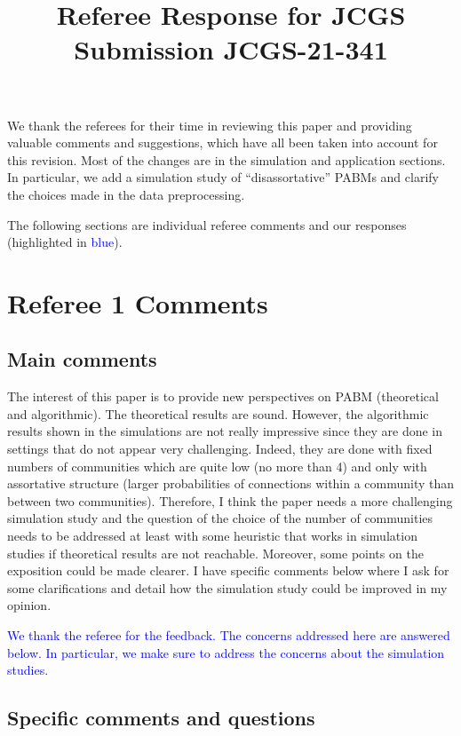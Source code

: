 \documentclass[
]{article}
\title{Referee Response for JCGS Submission JCGS-21-341}
\author{}
\date{\vspace{-2.5em}}
\begin{document}
\maketitle

We thank the referees for their time in reviewing this paper and
providing valuable comments and suggestions, which have all been taken
into account for this revision. Most of the changes are in the
simulation and application sections. In particular, we add a simulation
study of ``disassortative'' PABMs and clarify the choices made in the
data preprocessing.

The following sections are individual referee comments and our responses
(highlighted in \textcolor{blue}{blue}).

\hypertarget{referee-1-comments}{%
\section{Referee 1 Comments}\label{referee-1-comments}}

\hypertarget{main-comments}{%
\subsection{Main comments}\label{main-comments}}

The interest of this paper is to provide new perspectives on PABM
(theoretical and algorithmic). The theoretical results are sound.
However, the algorithmic results shown in the simulations are not really
impressive since they are done in settings that do not appear very
challenging. Indeed, they are done with fixed numbers of communities
which are quite low (no more than 4) and only with assortative structure
(larger probabilities of connections within a community than between two
communities). Therefore, I think the paper needs a more challenging
simulation study and the question of the choice of the number of
communities needs to be addressed at least with some heuristic that
works in simulation studies if theoretical results are not reachable.
Moreover, some points on the exposition could be made clearer. I have
specific comments below where I ask for some clarifications and detail
how the simulation study could be improved in my opinion.

\textcolor{blue}{
We thank the referee for the feedback. 
The concerns addressed here are answered below. 
In particular, we make sure to address the concerns about the simulation studies. 
}

\hypertarget{specific-comments-and-questions}{%
\subsection{Specific comments and
questions}\label{specific-comments-and-questions}}
\end{document}
